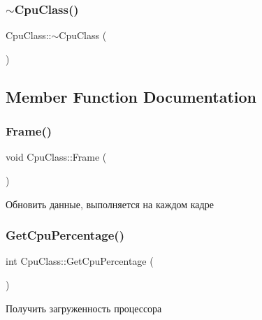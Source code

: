\mbox{\label{class_cpu_class_a9061f4ed0400c55a2aa1fad8610c172c}} 
\subsubsection{\texorpdfstring{$\sim$\+Cpu\+Class()}{~CpuClass()}}
{\footnotesize\ttfamily Cpu\+Class\+::$\sim$\+Cpu\+Class (\begin{DoxyParamCaption}{ }\end{DoxyParamCaption})}



\subsection{Member Function Documentation}
\mbox{\label{class_cpu_class_ad8c0d558a405c27c646c24ab327606d5}} 
\subsubsection{\texorpdfstring{Frame()}{Frame()}}
{\footnotesize\ttfamily void Cpu\+Class\+::\+Frame (\begin{DoxyParamCaption}{ }\end{DoxyParamCaption})}



Обновить данные, выполняется на каждом кадре 

\mbox{\label{class_cpu_class_ac6e6a24f919cc119c95aab883beb3461}} 
\subsubsection{\texorpdfstring{Get\+Cpu\+Percentage()}{GetCpuPercentage()}}
{\footnotesize\ttfamily int Cpu\+Class\+::\+Get\+Cpu\+Percentage (\begin{DoxyParamCaption}{ }\end{DoxyParamCaption})}



Получить загруженность процессора 


